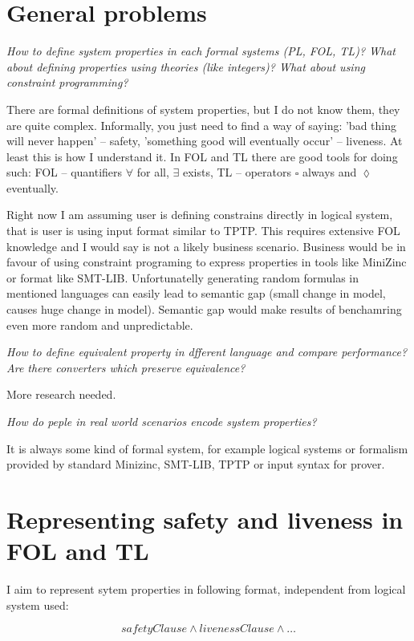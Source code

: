 \documentclass[a4paper,12pt]{article}
\begin{document}
\section{General problems}

\textit{How to define system properties in each formal systems (PL, FOL, TL)? What about defining properties using theories (like integers)? What about using constraint programming?}

There are formal definitions of system properties, but I do not know them, they are quite complex. Informally, you just need to find a way of saying: 'bad thing will never happen' -- safety, 'something good will eventually occur' -- liveness. At least this is how I understand it. In FOL and TL there are good tools for doing such: FOL -- quantifiers $\forall$ for all, $\exists$ exists, TL -- operators $\square$ always and $\lozenge$ eventually.

Right now I am assuming user is defining constrains directly in logical system, that is user is using input format similar to TPTP. This requires extensive FOL knowledge and I would say is not a likely  business scenario. Business would be in favour of using constraint programing to express properties in tools like MiniZinc or format like SMT-LIB. Unfortunatelly generating random formulas in mentioned languages can easily lead to semantic gap (small change in model, causes huge change in model). Semantic gap would make results of benchamring even more random and unpredictable.

\textit{How to define equivalent property in dfferent language and compare performance? Are there converters which preserve equivalence?}

More research needed.

\textit{How do peple in real world scenarios encode system properties?}

It is always some kind of formal system, for example logical systems or formalism provided by standard Minizinc, SMT-LIB, TPTP or input syntax for prover.

\newpage
\section{Representing safety and liveness in FOL and TL}

I aim to represent sytem properties in following format, independent from logical system used:

\begin{equation}
  safetyClause \land livenessClause \land \dots
\end{equation}
\end{document}
